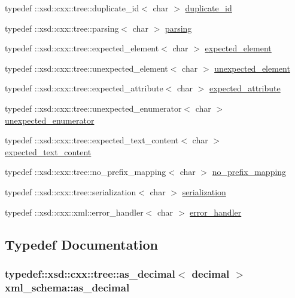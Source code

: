 \begin{DoxyCompactItemize}
\item 
typedef \+::xsd\+::cxx\+::tree\+::duplicate\+\_\+id$<$ char $>$ \hyperlink{namespacexml__schema_a6dc417261c18af4fcce090133dd605f8}{duplicate\+\_\+id}
\item 
typedef \+::xsd\+::cxx\+::tree\+::parsing$<$ char $>$ \hyperlink{namespacexml__schema_afbb8ed049be1751901785a29a6d13942}{parsing}
\item 
typedef \+::xsd\+::cxx\+::tree\+::expected\+\_\+element$<$ char $>$ \hyperlink{namespacexml__schema_a8deca57d1e322d97eea32518a7237a49}{expected\+\_\+element}
\item 
typedef \+::xsd\+::cxx\+::tree\+::unexpected\+\_\+element$<$ char $>$ \hyperlink{namespacexml__schema_a381b3f3410f9f6ba1f44c5500d90345b}{unexpected\+\_\+element}
\item 
typedef \+::xsd\+::cxx\+::tree\+::expected\+\_\+attribute$<$ char $>$ \hyperlink{namespacexml__schema_af16d098ecb2b5ba96a0734aa34bd8a5b}{expected\+\_\+attribute}
\item 
typedef \+::xsd\+::cxx\+::tree\+::unexpected\+\_\+enumerator$<$ char $>$ \hyperlink{namespacexml__schema_a7601f5d15eeb816df6a0e1cb2b0f379b}{unexpected\+\_\+enumerator}
\item 
typedef \+::xsd\+::cxx\+::tree\+::expected\+\_\+text\+\_\+content$<$ char $>$ \hyperlink{namespacexml__schema_ad0938777db5685ea04372a964518e87b}{expected\+\_\+text\+\_\+content}
\item 
typedef \+::xsd\+::cxx\+::tree\+::no\+\_\+prefix\+\_\+mapping$<$ char $>$ \hyperlink{namespacexml__schema_a103914036487a85ba84743f0e65b1d96}{no\+\_\+prefix\+\_\+mapping}
\item 
typedef \+::xsd\+::cxx\+::tree\+::serialization$<$ char $>$ \hyperlink{namespacexml__schema_a4d53cd67b012b824d27e3248c1b2c4b1}{serialization}
\item 
typedef \+::xsd\+::cxx\+::xml\+::error\+\_\+handler$<$ char $>$ \hyperlink{namespacexml__schema_a0a5d9528e9175cedf199984a8bb64d62}{error\+\_\+handler}
\end{DoxyCompactItemize}


\subsection{Typedef Documentation}
\subsubsection[{\texorpdfstring{as\+\_\+decimal}{as_decimal}}]{\setlength{\rightskip}{0pt plus 5cm}typedef\+::xsd\+::cxx\+::tree\+::as\+\_\+decimal$<$ {\bf decimal} $>$ {\bf xml\+\_\+schema\+::as\+\_\+decimal}}\hypertarget{namespacexml__schema_a9f2da4453eff69ce95bda90bc5be140c}{}\label{namespacexml__schema_a9f2da4453eff69ce95bda90bc5be140c}
